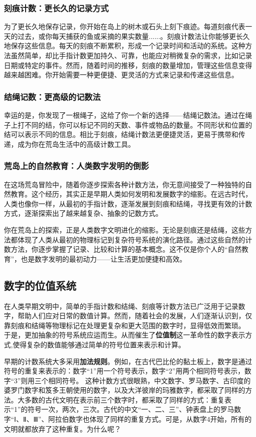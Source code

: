 \subsubsection{刻痕计数：更长久的记录方式}
为了更长久地保存记录，你开始在岛上的树木或石头上刻下痕迹。每道刻痕代表一天的过去，或你每天捕获的鱼或采摘的果实数量......。刻痕计数法让你能够更长久地保存这些信息。每天的刻痕不断累积，形成一个记录时间和活动的系统。这种方法虽然简单，却比手指计数更加持久、可靠，也能应对稍微复杂的需求，比如记录日期或特定的事件。然而，随着时间的推移，刻痕的数量增加，管理这些信息变得越来越困难。你开始需要一种更便捷、更灵活的方式来记录和传递这些信息。

\subsubsection{结绳记数：更高级的记数法}
幸运的是，你发现了一根绳子，这给了你一个新的选择——结绳记数法。通过在绳子上打不同的结，你可以标记不同的天数、事件或物品的数量。不同形状和位置的结可以表示不同的信息。相比于刻痕，结绳计数法更便捷灵活，更易于携带和传递，成为你在荒岛生活中的高级计数工具。

\subsubsection{荒岛上的自然教育：人类数字发明的倒影}
在这场荒岛冒险中，随着你逐步探索各种计数方法，你无意间接受了一种独特的自然教育。这个经历，其实正是早期人类如何发明和发展数字的缩影。在远古时代，人类也像你一样，从最初的手指计数，逐渐发展到刻痕和结绳，寻找更有效的计数方式，逐渐探索出了越来越复杂、抽象的记数方式。

你在荒岛上的探索，正是人类数字文明进化的缩影。无论是刻痕还是结绳，这些方法都体现了人类从最初的物理标记到复杂符号系统的演化路径。通过这些自然的计数方法，你逐步掌握了记录、比较和计算的基本概念。这不仅是你个人的“自然教育”，也是数字发明的最初动力——让生活更加便捷和高效。

\subsection{数字的位值系统}
在人类早期文明中，简单的手指计数和结绳、刻痕等计数方法已广泛用于记录数字，帮助人们应对日常的数值计算。然而，随着社会的发展，人们逐渐认识到，仅靠刻痕和结绳等物理标记在处理更复杂和更大范围的数字时，显得低效而繁琐。 于是，更加抽象的符号系统应运而生。从而催生了{\bf 位值制}这一革命性的数字表示方式,使得复杂的数值能够通过简单的符号位置来表示和计算。

早期的计数系统大多采用{\bf 加法规则}。例如，在古代巴比伦的黏土板上，数字是通过符号的重复来表示的：数字“1”用一个符号表示，数字“2”用两个相同符号表示，数字“3”则用三个相同符号。
这种计数方式很眼熟，中文数字、罗马数字、古印度的婆罗门数字和笈多王朝使用的数字，以及大洋彼岸的玛雅数字，都采取了同样的方法。大多数的古代文明在表示前三个数字时，都采取了同样的方式：重复表示“1”的符号一次，两次，三次。古代的中文“一、二、三”、钟表盘上的罗马数字“Ⅰ、Ⅱ、Ⅲ”、阿拉伯数字也体现了同样的重复方式。可是，从数字4开始，所有的文明就都放弃了这种重复。为什么呢？

